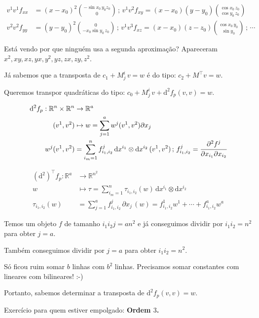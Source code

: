 \documentclass[12pt]{article}
\begin{document}
\begin{align}
v^1 v^1 f_{xx} &= (x - x_0)^2 \binom{-\sin x_0\,y_0z_0}{0}\,;\,v^1 v^2 f_{xy} = (x - x_0)(y - y_0) \binom{\cos x_0\,z_0}{\cos y_0\,z_0} \\
  v^2 v^2 f_{yy} &= (y - y_0)^2 \binom{0}{-x_0 \sin y_0\,z_0}\,;\,v^1 v^3 f_{xz} = (x - x_0)(z - z_0) \binom{\cos x_0\,y_0}{\sin y_0}\,;\,\cdots
\end{align}

Est\'a vendo por que ningu\'em usa a segunda aproxima\c{c}\~ao? Apareceram $x^2, xy, xz, yx, y^2, yz, zx, zy, z^2$.

J\'a sabemos que a transposta de $c_1 + M^i_j\,v = w$ \'e do tipo: $c_2 + M^\top v = w$.

Queremos transpor quadr\'aticas do tipo: $c_0 + M^i_j\,v + \mathrm{d}^2 f_p (v, v) = w$.

\begin{align}
	\mathrm{d}^2f_p : \mathbb{R}^n \times \mathbb{R}^n &\rightarrow \mathbb{R}^a \\
	(v^1, v^2) &\mapsto w = \sum_{j = 1}^a w^j(v^1, v^2) \partial x_j \\
	w^j(v^1, v^2) &= \sum_{i_m = 1}^n f_{i_1, i_2}^j\, \mathrm{d}x^{i_1} \otimes \mathrm{d}x^{i_2}\,(v^1, v^2)\,;\,f^j_{i_1, i_2} = \cfrac{\partial^2 f^j}{\partial x_{i_1} \partial x_{i_2}}
\end{align}

\begin{align}
	(\mathrm{d}^2)^\top f_p : \mathbb{R}^a &\rightarrow \mathbb{R}^{n^2} \\
	w &\mapsto \tau = \sum_{i_m = 1}^n \tau_{i_1, i_2}(w)\, \mathrm{d}x^{i_1} \otimes \mathrm{d}x^{i_2} \\
	\tau_{i_1, i_2} (w) &= \sum_{j = 1}^a f_{i_1, i_2}^j\, \partial x_j\,(w) = f_{i_1, i_2}^1 w^1 + \cdots + f_{i_1, i_2}^a w^a
\end{align}

Temos um objeto $f$ de tamanho $i_1i_2j = an^2$ e j\'a conseguimos dividir por $i_1i_2 = n^2$ para obter $j = a$.

Tamb\'em conseguimos dividir por $j = a$ para obter $i_1i_2 = n^2$.

S\'o ficou ruim somar $b$ linhas com $b^2$ linhas. Precisamos somar constantes com lineares com bilineares! :-)

Portanto, sabemos determinar a transposta de $\mathrm{d}^2 f_p (v, v) = w$.

Exerc\'icio para quem estiver empolgado: \textbf{Ordem $3$.}
\end{document}

